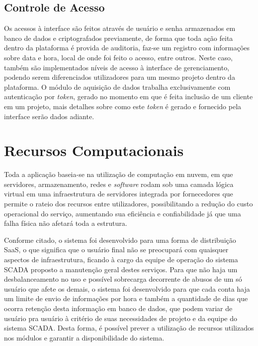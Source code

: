         \subsection{Controle de Acesso}
        \label{sec:controle-acesso}
        Os acessos à interface são feitos através de usuário e senha armazenados em banco de dados e criptografados previamente, de forma que toda ação feita dentro da plataforma é provida de auditoria, faz-se um registro com informações sobre data e hora, local de onde foi feito o acesso, entre outros. Neste caso, também são implementados níveis de acesso à interface de gerenciamento, podendo serem diferenciados utilizadores para um mesmo projeto dentro da plataforma. O módulo de aquisição de dados trabalha exclusivamente com autenticação por \textit{token}, gerado no momento em que é feita inclusão de um cliente em um projeto, mais detalhes sobre como este \textit{token} é gerado e fornecido pela interface serão dados adiante.
        
\section{Recursos Computacionais}
\label{sec:recursos-computacionais }
    Toda a aplicação baseia-se na utilização de computação em nuvem, em que servidores, armazenamento, redes e \textit{software} rodam sob uma camada lógica virtual em uma infraestrutura de servidores integrada por fornecedores que permite o rateio dos recursos entre utilizadores, possibilitando a redução do custo operacional do serviço, aumentando sua eficiência e confiabilidade já que uma falha física não afetará toda a estrutura.
    
    Conforme citado, o sistema foi desenvolvido para uma forma de distribuição \gls{SaaS}, o que significa que o usuário final não se preocupará com quaisquer aspectos de infraestrutura, ficando à cargo da equipe de operação do sistema \gls{SCADA} proposto a manutenção geral destes serviços. Para que não haja um desbalanceamento no uso e possível sobrecarga decorrente de abusos de um só usuário que afete os demais, o sistema foi desenvolvido para que cada conta haja um limite de envio de informações por hora e também a quantidade de dias que ocorra retenção desta informação em banco de dados, que podem variar de usuário pra usuário à critério de suas necessidades de projeto e da equipe do sistema \gls{SCADA}. Desta forma, é possível prever a utilização de recursos utilizados nos módulos e garantir a disponibilidade do sistema.


